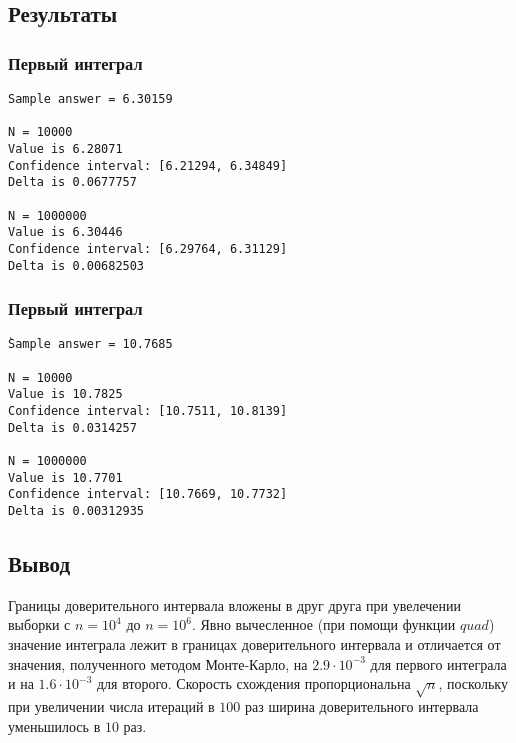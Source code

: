 \documentclass{article}
\begin{document}
        \subsection{Результаты}
            \subsubsection{Первый интеграл}
\begin{verbatim}
Sample answer = 6.30159

N = 10000
Value is 6.28071
Confidence interval: [6.21294, 6.34849]
Delta is 0.0677757

N = 1000000
Value is 6.30446
Confidence interval: [6.29764, 6.31129]
Delta is 0.00682503
\end{verbatim}
            \subsubsection{Первый интеграл}
\begin{verbatim}
̀Sample answer = 10.7685

N = 10000
Value is 10.7825
Confidence interval: [10.7511, 10.8139]
Delta is 0.0314257

N = 1000000
Value is 10.7701
Confidence interval: [10.7669, 10.7732]
Delta is 0.00312935
\end{verbatim}
        \subsection{Вывод}
            Границы доверительного интервала вложены в друг друга при увелечении выборки с $n = 10^4$ до $n = 10^6$.
            Явно вычесленное (при помощи функции $quad$) значение интеграла лежит в границах доверительного интер\-вала и отличается от значения, полученного методом Монте-Карло, на $2.9 \cdot 10^{-3}$ для первого интеграла и на $1.6 \cdot 10^{-3}$ для второго. Скорость схождения пропорциональна $\sqrt{n}$, поскольку при увеличении числа итераций в $100$ раз ширина доверительного интервала уменьшилось в $10$ раз.
\end{document}
